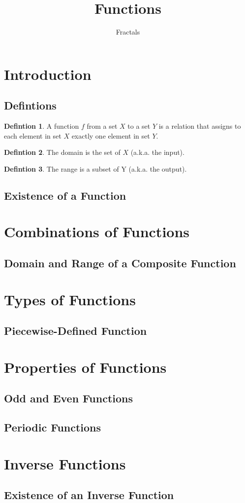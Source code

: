 \documentclass[a4paper]{article}
\theoremstyle{definition}
\newtheorem{definition}{Defintion}[section]
\begin{document}
\author{Fractals}
\title{\textbf{Functions}}
\maketitle
\tableofcontents
\noindent
\section{Introduction}
\subsection{Defintions}

\begin{definition}
    A function \(f\) from a set \(X\) to a set \(Y\) is a relation that assigns to each element in
    set \(X\) exactly one element in set \(Y\).
\end{definition}

\begin{definition}
    The domain is the set of \(X\) (a.k.a. the input).
\end{definition}

\begin{definition}
    The range is a subset of Y (a.k.a. the output).
\end{definition}

\subsection{Existence of a Function}

\section{Combinations of Functions}
\subsection{Domain and Range of a Composite Function}
\section{Types of Functions}
\subsection{Piecewise-Defined Function}
\section{Properties of Functions}
\subsection{Odd and Even Functions}
\subsection{Periodic Functions}
\section{Inverse Functions}
\subsection{Existence of an Inverse Function}
\end{document}

